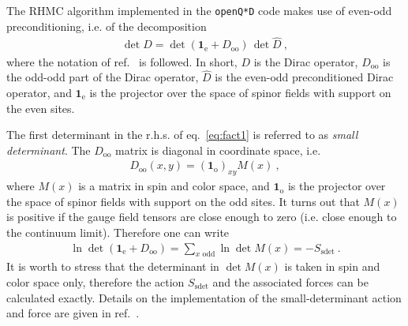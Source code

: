 \documentclass[11pt,fleqn]{article}
\begin{document}
The RHMC algorithm implemented in the \texttt{openQ*D} code makes use of even-odd preconditioning, i.e. of the decomposition
\begin{gather}
   \det D = \det ( \mathbf{1}_\text{e} + D_\text{oo} ) \, \det \hat{D} \ ,
   \label{eq:fact1}
\end{gather}
where the notation of ref.~\cite{openQCD:dirac} is followed. In short, $D$ is the Dirac operator, $D_\text{oo}$ is the odd-odd part of the Dirac operator, $\hat{D}$ is the even-odd preconditioned Dirac operator, and $\mathbf{1}_\text{e}$ is the projector over the space of spinor fields with support on the even sites.



The first determinant in the r.h.s. of eq.~\eqref{eq:fact1} is referred to as \textit{small determinant}. The $D_\text{oo}$ matrix is diagonal in coordinate space, i.e.
\begin{gather}
   D_\text{oo}(x,y) = (\mathbf{1}_\text{o})_{xy} M(x) \ ,
\end{gather}
where $M(x)$ is a matrix in spin and color space, and $\mathbf{1}_\text{o}$ is the projector over the space of spinor fields with support on the odd sites. It turns out that $M(x)$ is positive if the gauge field tensors are close enough to zero (i.e. close enough to the continuum limit). Therefore one can write
\begin{gather}
   \ln \det ( \mathbf{1}_\text{e} + D_\text{oo} ) = \sum_{x \text{ odd}} \ln \det M(x) = - S_\text{sdet} \ .
   \label{eq:Ssdet}
\end{gather}
It is worth to stress that the determinant in $\det M(x)$ is taken in spin and color space only, therefore the action $S_\text{sdet}$ and the associated forces can be calculated exactly. Details on the implementation of the small-determinant action and force are given in ref.~\cite{openQCD:forces}.
\end{document}
